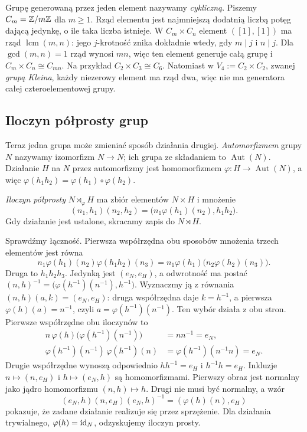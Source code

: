 \begin{przyklad}
Grupę generowaną przez jeden element nazywamy \emph{cykliczną}.
Piszemy $C_m=\mathbb{Z}/m\mathbb{Z}$ dla $m\geq1$. Rząd elementu jest najmniejszą
dodatnią liczbą potęg dającą jedynkę, o ile taka liczba istnieje.
W $C_m\times C_n$ element $([1],[1])$ ma rząd
$\operatorname{lcm}(m,n)$: jego $j$-krotność znika dokładnie wtedy,
gdy $m\mid j$ i $n\mid j$. Dla $\gcd(m,n)=1$ rząd wynosi $mn$,
więc ten element generuje całą grupę i $C_m\times C_n\cong C_{mn}$.
Na przykład $C_2\times C_3\cong C_6$. Natomiast w
$V_4:=C_2\times C_2$, zwanej \emph{grupą Kleina}, każdy niezerowy
element ma rząd dwa, więc nie ma generatora całej czteroelementowej grupy.
\end{przyklad}

\subsection*{Iloczyn półprosty grup}

Teraz jedna grupa może zmieniać sposób działania drugiej.
\emph{Automorfizmem} grupy $N$ nazywamy izomorfizm $N\to N$;
ich grupa ze składaniem to $\operatorname{Aut}(N)$.
Działanie $H$ na $N$ przez automorfizmy jest homomorfizmem
$\varphi:H\to\operatorname{Aut}(N)$, a więc
$\varphi(h_1h_2)=\varphi(h_1)\circ\varphi(h_2)$.

\begin{definicja}
\emph{Iloczyn półprosty} $N\rtimes_\varphi H$ ma zbiór elementów
$N\times H$ i mnożenie
\[
 (n_1,h_1)(n_2,h_2)
 =\bigl(n_1\varphi(h_1)(n_2),h_1h_2\bigr).
\]
Gdy działanie jest ustalone, skracamy zapis do $N\rtimes H$.
\end{definicja}

Sprawdźmy łączność. Pierwsza współrzędna obu sposobów mnożenia
trzech elementów jest równa
\[
 n_1\varphi(h_1)(n_2)\varphi(h_1h_2)(n_3)
 =n_1\varphi(h_1)\bigl(n_2\varphi(h_2)(n_3)\bigr).
\]
Druga to $h_1h_2h_3$. Jedynką jest $(e_N,e_H)$, a odwrotność
ma postać $(n,h)^{-1}=\bigl(\varphi(h^{-1})(n^{-1}),h^{-1}\bigr)$.
Wyznaczmy ją z równania $(n,h)(a,k)=(e_N,e_H)$:
druga współrzędna daje $k=h^{-1}$, a pierwsza
$\varphi(h)(a)=n^{-1}$, czyli $a=\varphi(h^{-1})(n^{-1})$.
Ten wybór działa z obu stron. Pierwsze współrzędne obu iloczynów to
\[
 \begin{aligned}
 n\,\varphi(h)\bigl(\varphi(h^{-1})(n^{-1})\bigr)
 &=nn^{-1}=e_N,\\
 \varphi(h^{-1})(n^{-1})\,\varphi(h^{-1})(n)
 &=\varphi(h^{-1})(n^{-1}n)=e_N.
 \end{aligned}
\]
Drugie współrzędne wynoszą odpowiednio $hh^{-1}=e_H$ i $h^{-1}h=e_H$.
Inkluzje $n\mapsto(n,e_H)$ i $h\mapsto(e_N,h)$ są homomorfizmami.
Pierwszy obraz jest normalny jako jądro homomorfizmu
$(n,h)\mapsto h$. Drugi nie musi być normalny, a wzór
\[
 (e_N,h)(n,e_H)(e_N,h)^{-1}=(\varphi(h)(n),e_H)
\]
pokazuje, że zadane działanie realizuje się przez sprzężenie.
Dla działania trywialnego, $\varphi(h)=\mathrm{id}_N$, odzyskujemy iloczyn prosty.

